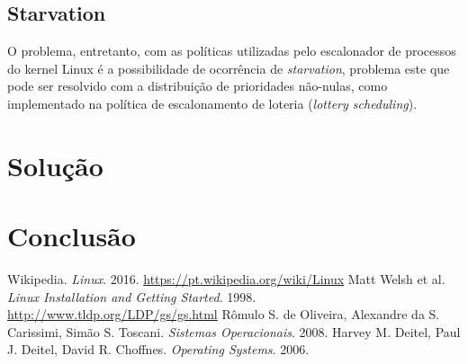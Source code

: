 \documentclass[a4paper,12pt]{article}
\begin{document}
\subsection{Starvation}
O problema, entretanto, com as políticas utilizadas pelo escalonador de processos do kernel Linux é a possibilidade de ocorrência de \emph{starvation}, problema este que pode ser resolvido com a distribuição de prioridades não-nulas, como implementado na política de escalonamento de loteria (\emph{lottery scheduling}).

\section{Solução}

\section{Conclusão}

\begin{thebibliography}{9}
 Wikipedia. \emph{Linux}. 2016. \url{https://pt.wikipedia.org/wiki/Linux}
 Matt Welsh et al. \emph{Linux Installation and Getting Started}. 1998. \url{http://www.tldp.org/LDP/gs/gs.html}
 Rômulo S. de Oliveira, Alexandre da S. Carissimi, Simão S. Toscani. \emph{Sistemas Operacionais}. 2008.
 Harvey M. Deitel, Paul J. Deitel, David R. Choffnes. \emph{Operating Systems}. 2006.
\end{thebibliography}
\end{document}
